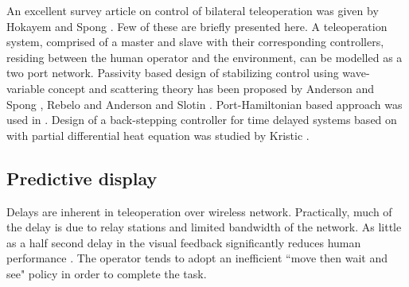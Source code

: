 An excellent survey article on control of bilateral teleoperation was given by Hokayem and Spong \cite{hokayem2006bilateral}. Few of these are briefly presented here. A teleoperation system, comprised of a master and slave with their corresponding controllers, residing between the human operator and the environment,   can be modelled as a two port network. Passivity based design of stabilizing control using  wave-variable concept and scattering theory has been proposed by Anderson and Spong \cite{anderson1989bilateral}, Rebelo \cite{rebelo2015time} and Anderson and Slotin \cite{niemeyer1991stable}.   Port-Hamiltonian  based approach was used in \cite{stramigioli2010novel,stramigioli2005sampled}. Design of a back-stepping controller for time delayed systems  based on  with partial differential heat  equation was studied by  Kristic \cite{krstic2009delay}. 



\subsection{Predictive display}
Delays are inherent in teleoperation over wireless network. Practically, much of the delay is due to relay stations and limited  bandwidth of the network.  As little as a half second delay in the visual feedback significantly reduces human performance \cite{chen2007human}. The operator tends to adopt an inefficient ``move then wait and see" policy in order to complete the task.

